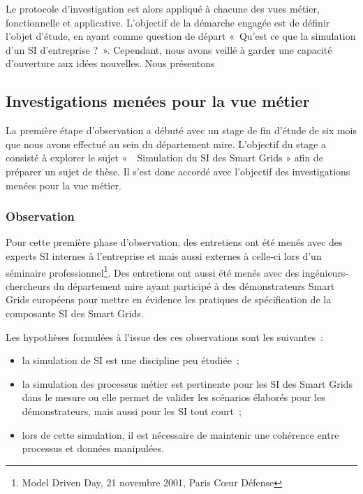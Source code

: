 	Le protocole d'investigation est alors appliqué à chacune des vues métier, 
fonctionnelle et applicative. L'objectif de la démarche engagée est de définir 
l'objet d'étude, en ayant comme question de départ «~Qu'est ce que la simulation 
d'un SI d'entreprise ?~». Cependant, nous avons veillé à garder une capacité 
d'ouverture aux idées nouvelles. Nous présentons
	
		\subsection{Investigations menées pour la vue métier}
			La première étape d'observation a débuté avec un stage de fin d'étude de six mois que nous avons effectué au sein du département \gls{mire}. L'objectif du stage a consisté à explorer le sujet «~~Simulation du SI des Smart Grids » afin de préparer un sujet de thèse. Il s'est donc accordé avec l'objectif des investigations menées pour la vue métier.
			
			\subsubsection{Observation}
				Pour cette première phase d'observation, des entretiens ont été menés avec des experts SI internes à l'entreprise et mais aussi externes à celle-ci lors d'un séminaire professionnel\footnote{Model Driven Day, 21 novembre 2001, Paris Cœur Défense}. Des entretiens ont aussi été menés avec des ingénieurs-chercheurs du département \gls{mire} ayant participé à des démonstrateurs Smart Grids européens pour mettre en évidence les pratiques de spécification de la composante SI des Smart Grids. 

				Les hypothèses formulées à l'issue des ces observations sont les suivantes~:
				\begin{itemize}
					\item la simulation de SI est une discipline peu étudiée~;
					\item la simulation des processus métier est pertinente pour les SI des Smart Grids dans le mesure ou elle permet de valider les scénarios élaborés pour les démonstrateurs, mais aussi pour les SI tout court~;
					\item lors de cette simulation, il est nécessaire de maintenir une cohérence entre processus et données manipulées.
				\end{itemize}
		
